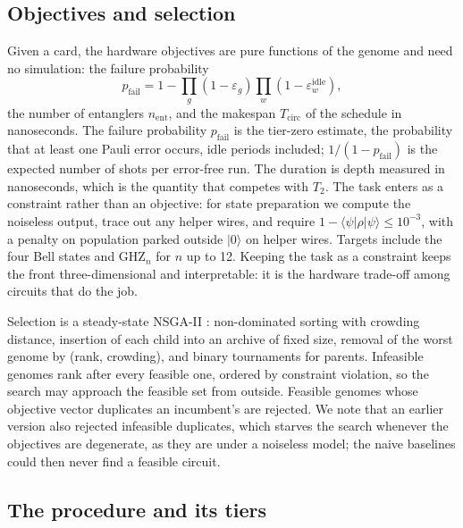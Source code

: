 \documentclass[10pt]{article}
\newcommand{\pfail}{p_{\mathrm{fail}}}
\begin{document}
\subsection{Objectives and selection}

Given a card, the hardware objectives are pure functions of the genome and
need no simulation: the failure probability
\begin{equation}
  \pfail = 1 - \prod_g (1 - \varepsilon_g) \prod_w (1 - \varepsilon^{\mathrm{idle}}_w),
  \label{eq:objectives}
\end{equation}
the number of entanglers $n_{\mathrm{ent}}$, and the makespan
$T_{\mathrm{circ}}$ of the schedule in nanoseconds.
The failure probability $\pfail$ is the tier-zero estimate, the probability
that at least one Pauli error occurs, idle periods included;
$1/(1 - \pfail)$ is the expected number of shots per error-free run. The
duration is depth measured in nanoseconds, which is the quantity that competes
with $T_2$. The task enters as a constraint rather than an objective: for
state preparation we compute the noiseless output, trace out any helper wires,
and require $1 - \langle\psi|\rho|\psi\rangle \le 10^{-3}$, with a penalty on
population parked outside $|0\rangle$ on helper wires. Targets include the four
Bell states and GHZ$_n$ for $n$ up to 12. Keeping the task as a constraint keeps
the front three-dimensional and interpretable: it is the hardware trade-off
among circuits that do the job.

Selection is a steady-state NSGA-II \cite{Deb2002}: non-dominated sorting with
crowding distance, insertion of each child into an archive of fixed size,
removal of the worst genome by (rank, crowding), and binary tournaments for
parents. Infeasible genomes rank after every feasible one, ordered by
constraint violation, so the search may approach the feasible set from
outside. Feasible genomes whose objective vector duplicates an incumbent's are
rejected. We note that an earlier version also rejected infeasible duplicates,
which starves the search whenever the objectives are degenerate, as they are
under a noiseless model; the naive baselines could then never find a feasible
circuit.

\subsection{The procedure and its tiers}
\end{document}
